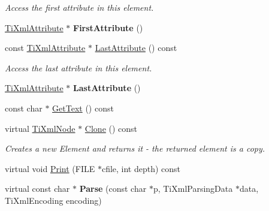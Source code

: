 \begin{DoxyCompactItemize}
\begin{DoxyCompactList}\small\item\em Access the first attribute in this element. \end{DoxyCompactList}\item 
\hypertarget{class_ti_xml_element_a4b33780fc565d38d6b54f640e0cf1737}{\hyperlink{class_ti_xml_attribute}{Ti\-Xml\-Attribute} $\ast$ {\bfseries First\-Attribute} ()}\label{class_ti_xml_element_a4b33780fc565d38d6b54f640e0cf1737}

\item 
\hypertarget{class_ti_xml_element_a86191b49f9177be132b85b14655f1381}{const \hyperlink{class_ti_xml_attribute}{Ti\-Xml\-Attribute} $\ast$ \hyperlink{class_ti_xml_element_a86191b49f9177be132b85b14655f1381}{Last\-Attribute} () const }\label{class_ti_xml_element_a86191b49f9177be132b85b14655f1381}

\begin{DoxyCompactList}\small\item\em Access the last attribute in this element. \end{DoxyCompactList}\item 
\hypertarget{class_ti_xml_element_a222f81cf06155cd108f2a68d4d176004}{\hyperlink{class_ti_xml_attribute}{Ti\-Xml\-Attribute} $\ast$ {\bfseries Last\-Attribute} ()}\label{class_ti_xml_element_a222f81cf06155cd108f2a68d4d176004}

\item 
const char $\ast$ \hyperlink{class_ti_xml_element_af3282294986cdb216646ea1f67af2c87}{Get\-Text} () const 
\item 
\hypertarget{class_ti_xml_element_aa464535ea1994db337cb6a8ce4b588b5}{virtual \hyperlink{class_ti_xml_node}{Ti\-Xml\-Node} $\ast$ \hyperlink{class_ti_xml_element_aa464535ea1994db337cb6a8ce4b588b5}{Clone} () const }\label{class_ti_xml_element_aa464535ea1994db337cb6a8ce4b588b5}

\begin{DoxyCompactList}\small\item\em Creates a new Element and returns it -\/ the returned element is a copy. \end{DoxyCompactList}\item 
virtual void \hyperlink{class_ti_xml_element_afbf52736e70fc91ec9d760721d6f4fd2}{Print} (F\-I\-L\-E $\ast$cfile, int depth) const 
\item 
\hypertarget{class_ti_xml_element_a697f51bbfff55b7e371c20278087c223}{virtual const char $\ast$ {\bfseries Parse} (const char $\ast$p, Ti\-Xml\-Parsing\-Data $\ast$data, Ti\-Xml\-Encoding encoding)}\label{class_ti_xml_element_a697f51bbfff55b7e371c20278087c223}


\end{DoxyCompactItemize}
